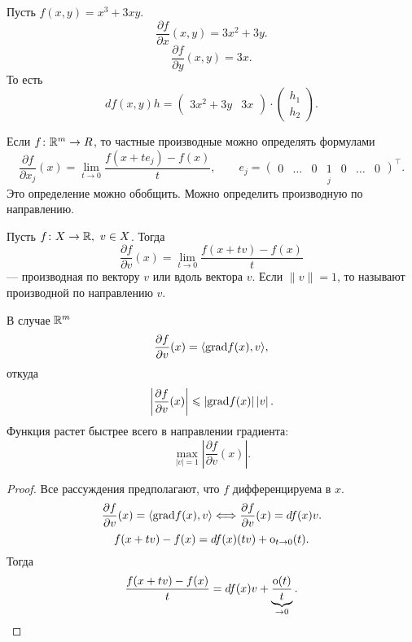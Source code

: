 \begin{ex}
    Пусть $ f(x, y) = x^3+ 3xy$. 
    \[
	\frac{ \partial f}{ \partial x}(x, y) = 3x^2+ 3y
    .\] 
    \[
	\frac{ \partial f}{ \partial y} (x, y) = 3x
    .\] 
    То есть
    \[
	df(x, y)h = 
    \begin{pmatrix}
	3x^2+3y & 3x
    \end{pmatrix}
    \cdot 
    \begin{pmatrix}
        h_1 \\ h_2
    \end{pmatrix}
    .\] 
\end{ex}
\begin{st}
    Если $ f \colon \mathbb{R}^{m}  \to  R$, то частные производные можно определять формулами
    \[
	\frac{ \partial f}{ \partial x_j} (x) = \lim_{t \to  0} \frac{ f(x+te_j) - f(x)}{t}, \qquad  e_j = 
	\underset{j}{\begin{pmatrix}
	    0& \ldots &0 & 1 &0& \ldots &0
    \end{pmatrix}}^\top
    .\]
    Это определение можно обобщить. Можно определить производную по направлению.
\end{st}
\begin{defn}
    Пусть $ f \colon X \to  \mathbb{R}, ~ v \in X$. Тогда 
    \[
	\frac{ \partial f}{ \partial v}(x) = \lim_{t \to  0} \frac{f(x+tv) - f(x)}{t}
    \] 
    --- {\sf производная по вектору} $ v$ или {\sf вдоль вектора}  $ v$. Если  $ \| v \| = 1$, то называют {\sf производной по направлению} $ v$.  
\end{defn}
\begin{prop}
    В случае $ \mathbb{R}^{m} $ 
    \[
	\frac{ \partial f}{ \partial v} (x) = \langle {\mathop{\text{\rm grad}}} f(x), v \rangle
    ,\] 
    откуда
    \[
	\left| \frac{ \partial f}{ \partial v}(x) \right| \leqslant \left| {\mathop{\text{\rm grad}}} f(x) \right| \left| v \right| 
    .\] 
    Функция растет быстрее всего в направлении градиента:
    \[
	\max_{\left| v \right| = 1} \left| \frac{ \partial f}{ \partial v} (x)\right| 
    .\] 
\end{prop}
\begin{proof}
    Все рассуждения предполагают, что $ f$ дифференцируема в $ x$.
     \[
	 \frac{ \partial f}{ \partial v} (x) = \langle {\mathop{\text{\rm grad}}} f(x), v \rangle \Longleftrightarrow \frac{ \partial f}{ \partial v} (x) = df(x) v
 .\] 
 \[
     f(x+tv) - f(x) = df(x)(tv) + {\mathop{\text{\rm o}}}_{t \to  0}(t)
 .\] 
 Тогда 
 \[
     \frac{ f(x + tv) -f(x)}{t} = df(x) v + \underbrace{\frac{ {\mathop{\text{\rm o}}}(t)}{t}}_{ \to  0}
 .\] 
\end{proof}
